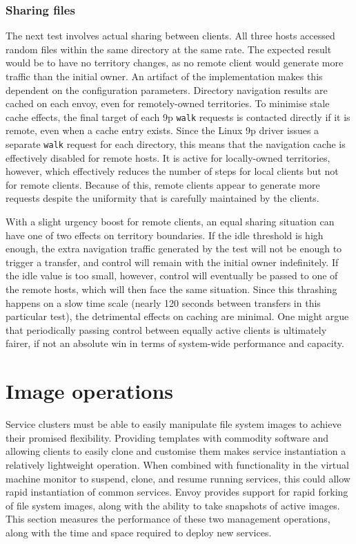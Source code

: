 \subsubsection{Sharing files}

The next test involves actual sharing between clients. All three hosts accessed random files within the same directory at the same rate. The expected result would be to have no territory changes, as no remote client would generate more traffic than the initial owner. An artifact of the implementation makes this dependent on the configuration parameters. Directory navigation results are cached on each envoy, even for remotely-owned territories. To minimise stale cache effects, the final target of each 9p \texttt{walk} requests is contacted directly if it is remote, even when a cache entry exists. Since the Linux 9p driver issues a separate \texttt{walk} request for each directory, this means that the navigation cache is effectively disabled for remote hosts. It is active for locally-owned territories, however, which effectively reduces the number of steps for local clients but not for remote clients. Because of this, remote clients appear to generate more requests despite the uniformity that is carefully maintained by the clients.

With a slight urgency boost for remote clients, an equal sharing situation can have one of two effects on territory boundaries. If the idle threshold is high enough, the extra navigation traffic generated by the test will not be enough to trigger a transfer, and control will remain with the initial owner indefinitely. If the idle value is too small, however, control will eventually be passed to one of the remote hosts, which will then face the same situation. Since this thrashing happens on a slow time scale (nearly 120 seconds between transfers in this particular test), the detrimental effects on caching are minimal. One might argue that periodically passing control between equally active clients is ultimately fairer, if not an absolute win in terms of system-wide performance and capacity.

\section{Image operations}\label{sec:image-operations}

Service clusters must be able to easily manipulate file system images to achieve their promised flexibility. Providing templates with commodity software and allowing clients to easily clone and customise them makes service instantiation a relatively lightweight operation. When combined with functionality in the virtual machine monitor to suspend, clone, and resume running services, this could allow rapid instantiation of common services. Envoy provides support for rapid forking of file system images, along with the ability to take snapshots of active images. This section measures the performance of these two management operations, along with the time and space required to deploy new services.

